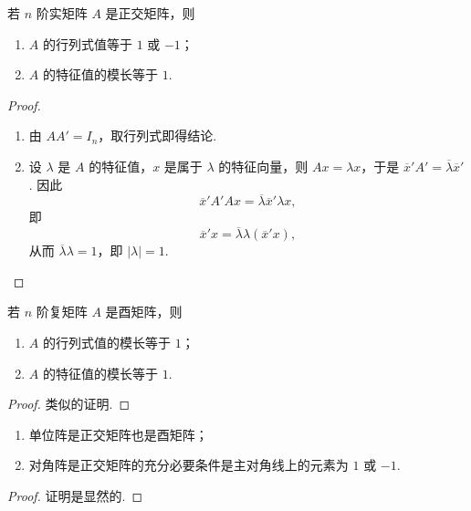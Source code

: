 \documentclass[../../main.tex]{subfiles}
\begin{document}
\begin{theorem}\label{theorem:正交矩阵的行列式和特征值}
若 $n$ 阶实矩阵 $A$ 是正交矩阵，则
\begin{enumerate}
\item $A$ 的行列式值等于 $1$ 或 $-1$；

\item $A$ 的特征值的模长等于 $1$.
\end{enumerate}
\end{theorem}
\begin{proof}
\begin{enumerate}
\item 由 $AA' = I_n$，取行列式即得结论.

\item 设 $\lambda$ 是 $A$ 的特征值，$x$ 是属于 $\lambda$ 的特征向量，则 $Ax = \lambda x$，于是 $\overline{x}'A' = \overline{\lambda}\overline{x}'$. 因此
\[
\overline{x}'A'Ax = \overline{\lambda}\overline{x}'\lambda x,
\]
即
\[
\overline{x}'x = \overline{\lambda}\lambda(\overline{x}'x),
\]
从而 $\overline{\lambda}\lambda = 1$，即 $|\lambda| = 1$. 
\end{enumerate}
\end{proof}

\begin{theorem}\label{theorem:酉矩阵的行列式和特征值}
若 $n$ 阶复矩阵 $A$ 是酉矩阵，则
\begin{enumerate}
\item $A$ 的行列式值的模长等于 $1$；

\item $A$ 的特征值的模长等于 $1$.
\end{enumerate}
\end{theorem}
\begin{proof}
类似的证明.
\end{proof}

\begin{proposition}\label{proposition:常见的正交矩阵和酉矩阵}
\begin{enumerate}[(1)]
\item 单位阵是正交矩阵也是酉矩阵；

\item 对角阵是正交矩阵的充分必要条件是主对角线上的元素为 $1$ 或 $-1$. 
\end{enumerate}
\end{proposition}
\begin{proof}
证明是显然的.
\end{proof}
\end{document}
